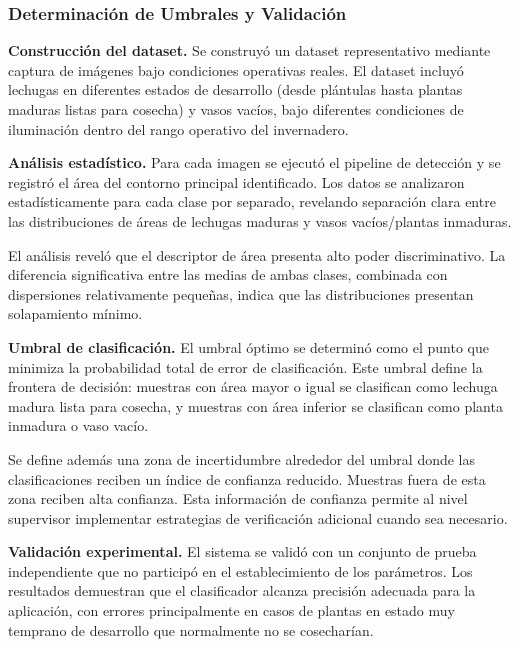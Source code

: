 \subsubsection{Determinación de Umbrales y Validación}

\textbf{Construcción del dataset.} Se construyó un dataset representativo mediante captura de imágenes bajo condiciones operativas reales. El dataset incluyó lechugas en diferentes estados de desarrollo (desde plántulas hasta plantas maduras listas para cosecha) y vasos vacíos, bajo diferentes condiciones de iluminación dentro del rango operativo del invernadero.

\textbf{Análisis estadístico.} Para cada imagen se ejecutó el pipeline de detección y se registró el área del contorno principal identificado. Los datos se analizaron estadísticamente para cada clase por separado, revelando separación clara entre las distribuciones de áreas de lechugas maduras y vasos vacíos/plantas inmaduras.

El análisis reveló que el descriptor de área presenta alto poder discriminativo. La diferencia significativa entre las medias de ambas clases, combinada con dispersiones relativamente pequeñas, indica que las distribuciones presentan solapamiento mínimo.

\textbf{Umbral de clasificación.} El umbral óptimo se determinó como el punto que minimiza la probabilidad total de error de clasificación. Este umbral define la frontera de decisión: muestras con área mayor o igual se clasifican como lechuga madura lista para cosecha, y muestras con área inferior se clasifican como planta inmadura o vaso vacío.

Se define además una zona de incertidumbre alrededor del umbral donde las clasificaciones reciben un índice de confianza reducido. Muestras fuera de esta zona reciben alta confianza. Esta información de confianza permite al nivel supervisor implementar estrategias de verificación adicional cuando sea necesario.

\textbf{Validación experimental.} El sistema se validó con un conjunto de prueba independiente que no participó en el establecimiento de los parámetros. Los resultados demuestran que el clasificador alcanza precisión adecuada para la aplicación, con errores principalmente en casos de plantas en estado muy temprano de desarrollo que normalmente no se cosecharían.
